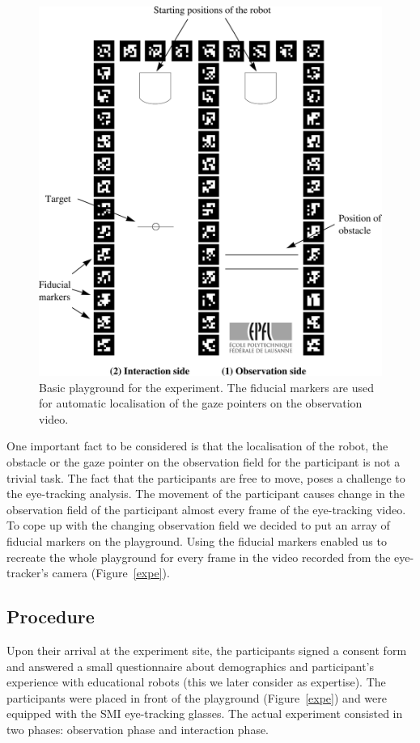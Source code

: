 \documentclass{sig-alternate}
\begin{document}
\begin{figure}
    \centering
    \includegraphics[width=0.9\linewidth]{maze}
    \caption{\small Basic playground for the experiment. The fiducial markers
    are used for automatic localisation of the gaze pointers on the observation
    video.}

    \label{playground}
\end{figure}

One important fact to be considered is that the localisation of the
robot, the obstacle or the gaze pointer on the observation field for the
participant is not a trivial task. The fact that the participants are
free to move, poses a challenge to the eye-tracking analysis. The
movement of the participant causes change in the observation field of
the participant almost every frame of the eye-tracking video. To cope up
with the changing observation field we decided to put an array of
fiducial markers on the playground. Using the fiducial markers enabled
us to recreate the whole playground for every frame in the video
recorded from the eye-tracker's camera (Figure~\ref{expe}).

\subsection{Procedure}

Upon their arrival at the experiment site, the participants signed a
consent form and answered a small questionnaire about demographics and
participant's experience with educational robots (this we later consider
as expertise). The participants were placed in front of the playground
(Figure~\ref{expe}) and were equipped with the SMI eye-tracking glasses. The
actual experiment consisted in two phases: observation phase and
interaction phase.
\end{document}
